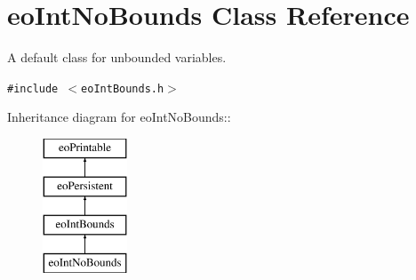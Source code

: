 \section{eo\-Int\-No\-Bounds Class Reference}
\label{classeo_int_no_bounds}
A default class for unbounded variables.  


{\tt \#include $<$eo\-Int\-Bounds.h$>$}

Inheritance diagram for eo\-Int\-No\-Bounds::\begin{figure}[H]
\begin{center}
\leavevmode
\includegraphics[height=4cm]{classeo_int_no_bounds}
\end{center}
\end{figure}

